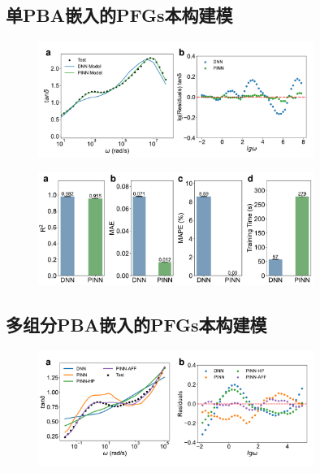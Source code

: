 \subsection{单PBA嵌入的PFGs本构建模}
\begin{figure}[htbp]
  \centering
  \includegraphics[width=0.8\textwidth]{Fig/pfgs-single.pdf}
\end{figure}

\begin{figure}[htbp]
  \centering
  \includegraphics[width=0.8\textwidth]{Fig/pfgs-single-metrics.pdf}
\end{figure}
\subsection{多组分PBA嵌入的PFGs本构建模}
\begin{figure}[htbp]
  \centering
  \includegraphics[width=0.8\textwidth]{Fig/pfgs-com.pdf}
\end{figure}

